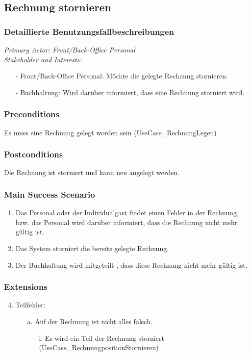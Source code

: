 \documentclass[./detailed_overview_usecases.tex]{subfiles}
\begin{document}
    \subsection{Rechnung stornieren}
    \subsubsection{Detaillierte Benutzungsfallbeschreibungen}
    \textit{Primary Actor: Front/Back-Office Personal}
    \\
    \textit{Stakeholder and Interests:}
    \begin{itemize}
        \item[-] Front/Back-Office Personal: Möchte die gelegte Rechnung stornieren.
        \item[-] Buchhaltung: Wird darüber informiert, dass eine Rechnung storniert wird.
    \end{itemize}

    \subsubsection*{Preconditions}
    Es muss eine Rechnung gelegt worden sein (UseCase_RechnungLegen)

    \subsubsection*{Postconditions}
    Die Rechnung ist storniert und kann neu angelegt werden.

    \subsubsection*{Main Success Scenario}
    \begin{enumerate}
        \item Das Personal oder der Individualgast findet einen Fehler in der Rechnung, bzw. das Personal wird darüber informiert, dass die Rechnung nicht mehr gültig ist.
        \item Das System storniert die bereits gelegte Rechnung.
        \item Der Buchhaltung wird mitgeteilt , dass diese Rechnung nicht mehr gültig ist.
    \end{enumerate}

    \subsubsection*{Extensions}
    \begin{enumerate}
        \setcounter{enumi}{3}
        \item Teilfehler:
        \begin{itemize}
            \item[a.] Auf der Rechnung ist nicht alles falsch.
            \begin{itemize}
                \item[i.] Es wird ein Teil der Rechnung storniert (UseCase_RechnungpositionStornieren)
            \end{itemize}
        \end{itemize}
    \end{enumerate}
\end{document}
